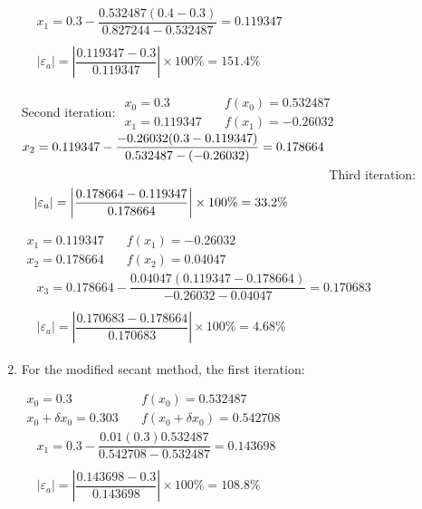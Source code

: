 \documentclass[../main.tex]{subfiles}
\begin{document}
\begin{enumerate}[label=\bfseries(\alph*)]
\bigbreak
$
\begin{aligned}
&x_{1}=0.3-\dfrac{0.532487(0.4-0.3)}{0.827244-0.532487}=0.119347 \\\\
&\left|\varepsilon_{a}\right|=\left|\dfrac{0.119347-0.3}{0.119347}\right| \times 100 \%=151.4 \%
\end{aligned}$

\bigbreak
Second iteration:
\bigbreak
$\begin{array}{ll}
x_{0}=0.3 &\quad f\left(x_{0}\right)=0.532487 \\
x_{1}=0.119347 &\quad f\left(x_{1}\right)=-0.26032
\end{array}$
\bigbreak
$
\begin{aligned}
x_{2}=0.119347-\dfrac{-0.26032(0.3-0.119347)}{0.532487-(-0.26032)}=0.178664 \\\\
&\hspace*{-8.1cm}\left|\varepsilon_{a}\right|=\left|\dfrac{0.178664-0.119347}{0.178664}\right| \times 100 \%=33.2 \%
\end{aligned}$
\bigbreak
Third iteration:
\bigbreak

$\begin{array}{ll}x_{1}=0.119347 &\quad f\left(x_{1}\right)=-0.26032 \\x_{2}=0.178664 &\quad f\left(x_{2}\right)=0.04047\end{array}$
\bigbreak
$
\begin{aligned}
&x_{3}=0.178664-\dfrac{0.04047(0.119347-0.178664)}{-0.26032-0.04047}=0.170683 \\\\ & \left|\varepsilon_{a}\right|=\left|\dfrac{0.170683-0.178664}{0.170683}\right| \times 100 \%=4.68 \%
\end{aligned}$
\bigbreak

\item For the modified secant method, the first iteration:
\bigbreak

$\begin{array}{ll}x_{0}=0.3 &\quad f\left(x_{0}\right)=0.532487 \\x_{0}+\delta x_{0}=0.303 &\quad f\left(x_{0}+\delta x_{0}\right)=0.542708\end{array}$
\bigbreak$
\begin{aligned}
&x_{1}=0.3-\dfrac{0.01(0.3) 0.532487}{0.542708-0.532487}=0.143698 \\\\
&\left|\varepsilon_{a}\right|=\left|\dfrac{0.143698-0.3}{0.143698}\right| \times 100 \%=108.8 \%
\end{aligned}$
\bigbreak



\end{enumerate}
\end{document}
